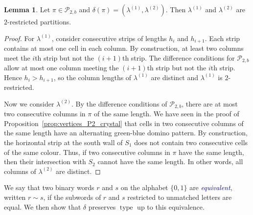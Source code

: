 \documentclass[11pt]{article}
\theoremstyle{definition}
\newtheorem{lemma}[theorem]{Lemma}
\theoremstyle{remark}
\theoremstyle{definition}
\numberwithin{equation}{section}
\newcommand{\type}{\operatorname{type}}
\renewcommand\emph[1]{\textcolor{darkblue}{\it #1}}
\begin{document}
\begin{lemma}\label{lemma:delta_well-def}
Let $\pi\in\mathcal{P}_{2,b}$ and $\delta(\pi)=(\lambda^{(1)},\lambda^{(2)})$. Then $\lambda^{(1)}$ and $\lambda^{(2)}$ are $2$-restricted partitions.
\end{lemma}
\begin{proof}
For \(\lambda^{(1)}\), consider consecutive strips of lengths \(h_i\) and \(h_{i+1}\). Each strip contains at most one cell in each column. By construction, at least two columns meet the \(i\)th strip but not the \((i+1)\)th strip. The difference conditions for \( \mathcal{P}_{2,b} \) allow at most one column meeting the \((i+1)\)th strip but not the \(i\)th strip. Hence \( h_i > h_{i+1} \), so the column lengths of \( \lambda^{(1)} \) are distinct and \( \lambda^{(1)} \) is $2$-restricted.

Now we consider $\lambda^{(2)}$. By the difference conditions of $\mathcal{P}_{2,b}$, there are at most two consecutive columns in $\pi$ of the same length. We have seen in the proof of Proposition~\ref{prop:vertices_P2_crystal} that cells in two consecutive columns of the same length have an alternating green-blue domino pattern. By construction, the horizontal strip at the south wall of $S_1$ does not contain two consecutive cells of the same colour. Thus, if two consecutive columns in $\pi$ have the same length, then their intersection with $S_2$ cannot have the same length. In other words, all columns of $\lambda^{(2)}$ are distinct.
\end{proof}

We say that two binary words \(r\) and \(s\) on the alphabet $\{0,1\}$ are \emph{equivalent},
written \(r\sim s\), if the subwords of $r$ and $s$ restricted to
unmatched letters are equal. We then show that \(\delta\) preserves \(\type\) up to this equivalence.
\end{document}

